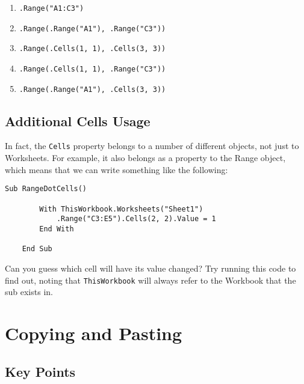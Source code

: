 \documentclass[11pt]{article}%
\begin{document}
\begin{enumerate}
    \item \texttt{.Range("A1:C3")}
    \item \texttt{.Range(.Range("A1"), .Range("C3"))}
    \item \texttt{.Range(.Cells(1, 1), .Cells(3, 3))}
    \item \texttt{.Range(.Cells(1, 1), .Range("C3"))}
    \item \texttt{.Range(.Range("A1"), .Cells(3, 3))}
\end{enumerate}


\subsection{Additional Cells Usage}\label{subsec:ExtraCells}

In fact, the \texttt{Cells} property belongs to a number of different objects, not just to Worksheets. For example, it also belongs as a property to the Range object, which means that we can write something like the following:\\

\begin{lstlisting}[style=A]
    Sub RangeDotCells()

        With ThisWorkbook.Worksheets("Sheet1")
            .Range("C3:E5").Cells(2, 2).Value = 1
        End With

    End Sub
\end{lstlisting}

Can you guess which cell will have its value changed? Try running this code to find out, noting that \texttt{ThisWorkbook} will always refer to the Workbook that the sub exists in.



\section{Copying and Pasting}


\subsection{Key Points}
\end{document}
